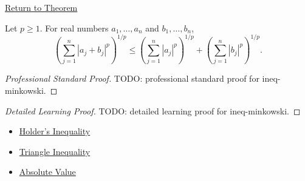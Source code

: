 \newpage
{}
\label{prf:ineq-minkowski}

\begin{remark*}[Return]
\hyperref[thm:ineq-minkowski]{Return to Theorem}
\end{remark*}

\begin{theorem*}
Let $p\ge1$. For real numbers $a_1,\dots,a_n$ and $b_1,\dots,b_n$,
\[
\left(\sum_{j=1}^{n}|a_j+b_j|^p\right)^{1/p}
\le
\left(\sum_{j=1}^{n}|a_j|^p\right)^{1/p}
+
\left(\sum_{j=1}^{n}|b_j|^p\right)^{1/p}.
\]
\end{theorem*}

\begin{proof}[Professional Standard Proof]
\LRAProofBodyStart
TODO: professional standard proof for ineq-minkowski.
\end{proof}

\begin{proof}[Detailed Learning Proof]
\LRAProofBodyStart
TODO: detailed learning proof for ineq-minkowski.
\end{proof}

\begin{remark*}
\end{remark*}

\begin{dependencies}
\begin{itemize}
  \item \hyperref[thm:ineq-holder]{Holder's Inequality}
  \item \hyperref[thm:triangle-inequality]{Triangle Inequality}
  \item \hyperref[def:absolute-value]{Absolute Value}
\end{itemize}
\end{dependencies}

\clearpage

